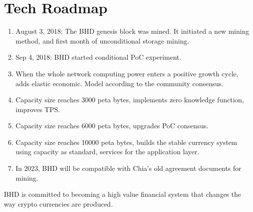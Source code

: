 \chapter{Tech Roadmap}
\begin{enumerate}
    \item August 3, 2018: The BHD genesis block was mined. It initiated a new mining method, and first month of unconditional storage mining.
    \item Sep 4, 2018: BHD started conditional PoC experiment.
    \item When the whole network computing power enters a positive growth cycle, adds elastic economic. Model according to the community consensus.
    \item Capacity size reaches 3000 peta bytes, implements zero knowledge function, improves TPS.
    \item Capacity size reaches 6000 peta bytes, upgrades PoC consensus.
    \item Capacity size reaches 10000 peta bytes, builds the stable currency system using capacity as standard, services for the application layer.
    \item In 2023, BHD will be compatible with Chia's old agreement documents for mining.
\end{enumerate}
\begin{flushleft}
    BHD is committed to becoming a high value financial system that changes the way crypto currencies are produced.
\end{flushleft}
